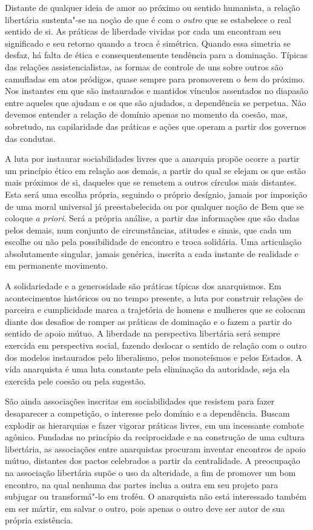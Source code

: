 Distante de qualquer ideia de amor ao próximo ou sentido humanista, a
relação libertária sustenta"-se na noção de que é com o \emph{outro} que
se estabelece o real sentido de si. As práticas de liberdade vividas por
cada um encontram seu significado e seu retorno quando a troca é
simétrica. Quando essa simetria se desfaz, há falta de ética e
consequentemente tendência para a dominação. Típicas das relações
assistencialistas, as formas de controle de uns sobre outros são
camufladas em atos pródigos, quase sempre para promoverem o \emph{bem}
do próximo. Nos instantes em que são instaurados e mantidos vínculos
assentados no diapasão entre aqueles que ajudam e os que são ajudados, a
dependência se perpetua. Não devemos entender a relação de domínio
apenas no momento da coesão, mas, sobretudo, na capilaridade das
práticas e ações que operam a partir dos governos das condutas.

A luta por instaurar sociabilidades livres que a anarquia propõe ocorre
a partir um princípio ético em relação aos demais, a partir do qual se
elejam os que estão mais próximos de si, daqueles que se remetem a
outros círculos mais distantes. Esta será uma escolha própria, seguindo
o próprio desígnio, jamais por imposição de uma moral universal já
preestabelecida ou por qualquer noção de Bem que se coloque \emph{a
priori}. Será a própria análise, a partir das informações que são dadas
pelos demais, num conjunto de circunstâncias, atitudes e sinais, que
cada um escolhe ou não pela possibilidade de encontro e troca solidária.
Uma articulação absolutamente singular, jamais genérica, inscrita a cada
instante de realidade e em permanente movimento.

A solidariedade e a generosidade são práticas típicas dos anarquismos.
Em acontecimentos históricos ou no tempo presente, a luta por construir
relações de parceira e cumplicidade marca a trajetória de homens e
mulheres que se colocam diante dos desafios de romper as práticas de
dominação e o fazem a partir do sentido de apoio mútuo. A liberdade na
perspectiva libertária será sempre exercida em perspectiva social,
fazendo deslocar o sentido de relação com o outro dos modelos
instaurados pelo liberalismo, pelos monoteísmos e pelos Estados. A vida
anarquista é uma luta constante pela eliminação da autoridade, seja ela
exercida pele coesão ou pela sugestão.

São ainda associações inscritas em sociabilidades que resistem para
fazer desaparecer a competição, o interesse pelo domínio e a
dependência. Buscam explodir as hierarquias e fazer vigorar práticas
livres, em um incessante combate agônico. Fundadas no princípio da
reciprocidade e na construção de uma cultura libertária, as associações
entre anarquistas procuram inventar encontros de apoio mútuo, distantes
dos pactos celebrados a partir da centralidade. A preocupação na
associação libertária supõe o uso da alteridade, a fim de promover um
bom encontro, na qual nenhuma das partes inclua a outra em seu projeto
para subjugar ou transformá"-lo em troféu. O anarquista não está
interessado também em ser mártir, em salvar o outro, pois apenas o outro
deve ser autor de sua própria existência.

